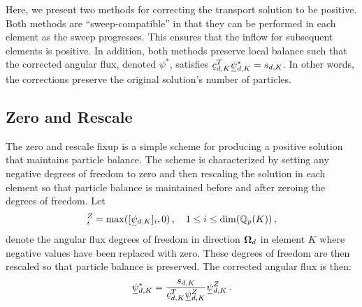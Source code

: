 \documentclass[../doc.tex]{subfiles}
\begin{document}
Here, we present two methods for correcting the transport solution to be positive. Both methods are ``sweep-compatible'' in that they can be performed in each element as the sweep progresses. This ensures that the inflow for subsequent elements is positive. In addition, both methods preserve local balance such that the corrected angular flux, denoted $\psi^*$, satisfies $\ubar{c}_{d,K}^T \ubar{\psi}_{d,K}^* = s_{d,K}$. In other words, the corrections preserve the original solution's number of particles. 

\subsection{Zero and Rescale}
The zero and rescale fixup \cite{hamilton2009negative} is a simple scheme for producing a positive solution that maintains particle balance. The scheme is characterized by setting any negative degrees of freedom to zero and then rescaling the solution in each element so that particle balance is maintained before and after zeroing the degrees of freedom. Let 
	\begin{equation}
		[\ubar{\psi}_{d,K}]_i^Z = \max([\ubar{\psi}_{d,K}]_i, 0) \,, \quad 1 \leq i \leq \dim(\Qbb{p}(K)) \,, 
	\end{equation}
denote the angular flux degrees of freedom in direction $\boldsymbol{\Omega}_d$ in element $K$ where negative values have been replaced with zero. These degrees of freedom are then rescaled so that particle balance is preserved. The corrected angular flux is then: 
	\begin{equation}
		\ubar{\psi}_{d,K}^* = \frac{s_{d,K}}{\ubar{c}_{d,K}^T \ubar{\psi}_{d,K}^Z} \ubar{\psi}_{d,K}^Z \,. 
	\end{equation}
\end{document}
